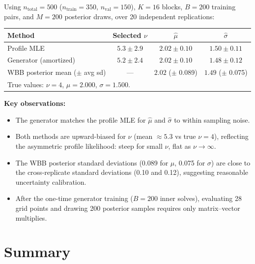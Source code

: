 \documentclass[12pt]{article}
\begin{document}
Using $n_{\mathrm{total}} = 500$ ($n_{\mathrm{train}} = 350$, $n_{\mathrm{val}} = 150$), $K=16$ blocks, $B=200$ training pairs, and $M=200$ posterior draws, over 20 independent replications:

\begin{center}
\begin{tabular}{lccc}
\hline
Method & Selected $\nu$ & $\hat\mu$ & $\hat\sigma$ \\
\hline
Profile MLE & $5.3 \pm 2.9$ & $2.02 \pm 0.10$ & $1.50 \pm 0.11$ \\
Generator (amortized) & $5.2 \pm 2.4$ & $2.02 \pm 0.10$ & $1.48 \pm 0.12$ \\
WBB posterior mean ($\pm$ avg sd) & --- & $2.02$ ($\pm$ 0.089) & $1.49$ ($\pm$ 0.075) \\
\hline
\multicolumn{4}{l}{True values: $\nu = 4$, $\mu = 2.000$, $\sigma = 1.500$.}\\
\hline
\end{tabular}
\end{center}

\textbf{Key observations:}
\begin{itemize}
\item The generator matches the profile MLE for $\hat\mu$ and $\hat\sigma$ to within sampling noise.
\item Both methods are upward-biased for $\nu$ (mean $\approx 5.3$ vs true $\nu=4$), reflecting the asymmetric profile likelihood: steep for small $\nu$, flat as $\nu\to\infty$.
\item The WBB posterior standard deviations (0.089 for $\mu$, 0.075 for $\sigma$) are close to the cross-replicate standard deviations (0.10 and 0.12), suggesting reasonable uncertainty calibration.
\item After the one-time generator training ($B=200$ inner solves), evaluating 28 grid points and drawing 200 posterior samples requires only matrix--vector multiplies.
\end{itemize}

\section{Summary}

\begin{center}
\end{center}
\end{document}
